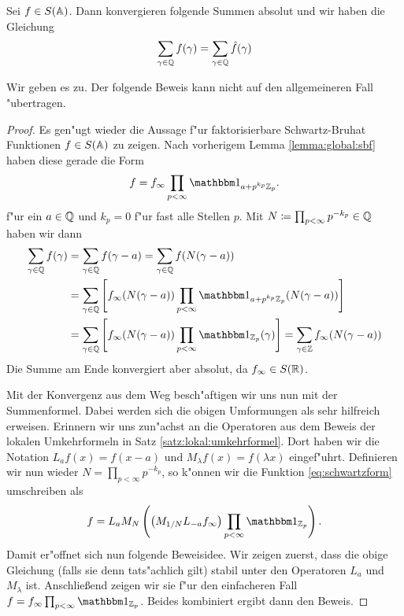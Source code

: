 	\begin{satz}
	\label{satz:global:poisson}
		Sei $f \in S(\mathbb{A})$. Dann konvergieren folgende Summen absolut und wir haben die Gleichung
		\begin{align}
			\sum_{\gamma \in \mathbb{Q}} {f(\gamma)} = \sum_{\gamma \in \mathbb{Q}}{\hat{f}(\gamma)}
		\end{align}
	\end{satz}
	Wir geben es zu. Der folgende Beweis kann nicht auf den allgemeineren Fall "ubertragen.
	\begin{proof}
		Es gen"ugt wieder die Aussage f"ur faktorisierbare Schwartz-Bruhat Funktionen $f \in S(\mathbb{A})$ zu zeigen.
		Nach vorherigem Lemma \ref{lemma:global:sbf} haben diese gerade die Form
		\begin{align}
		\label{eq:schwartzform}
			f = f_\infty\prod_{p<\infty} \ind_{a+p^{k_p}\Zp}.
		\end{align}
		f"ur ein $a \in \mathbb{Q}$ und $k_p = 0$ f"ur fast alle Stellen $p$.
		Mit $N\coloneqq \prod_{p<\infty} p^{-k_p} \in \mathbb{Q}$ haben wir dann
		\begin{align*}
			\sum_{\gamma \in \K} {f(\gamma)} 	&= 	\sum_{\gamma \in \K} f(\gamma - a)
												= 	\sum_{\gamma \in \K} f(N(\gamma - a)) \\
												&= 	\sum_{\gamma \in \K} \left[ f_\infty (N(\gamma - a))  \prod_{p< \infty} \ind_{a+p^{k_p}\Zp}(N(\gamma - a)) \right] \\
												&= 	\sum_{\gamma \in \K} \left[ f_\infty (N(\gamma - a))  \prod_{p< \infty} \ind_{\Zp}(\gamma) \right]
												=	\sum_{\gamma \in \Z} f_\infty (N(\gamma - a))
		\end{align*}
		Die Summe am Ende konvergiert aber absolut, da $f_\infty \in S(\mathbb{R})$.
		
		Mit der Konvergenz aus dem Weg besch"aftigen wir uns nun mit der Summenformel.
		Dabei werden sich die obigen Umformungen als sehr hilfreich erweisen.
		Erinnern wir uns zun"achst an die Operatoren aus dem Beweis der lokalen Umkehrformeln in Satz \ref{satz:lokal:umkehrformel}.
		Dort haben wir die Notation $L_a f(x) = f(x-a)$ und $M_\lambda f(x) = f(\lambda x)$ eingef"uhrt.
		Definieren wir nun wieder $N= \prod_{p<\infty} p^{-k_p}$, so k"onnen wir die Funktion \ref{eq:schwartzform} umschreiben als
		\begin{align*}
			f = L_a M_{N}\left( \left(M_{1/N} L_{-a} f_\infty\right) \prod_{p<\infty}\ind_{\Zp}\right).
		\end{align*}
		Damit er"offnet sich nun folgende Beweisidee. 
		Wir zeigen zuerst, dass die obige Gleichung (falls sie denn tats"achlich gilt) stabil unter den Operatoren $L_a$ und $M_\lambda$ ist.
		Anschließend zeigen wir sie f"ur den einfacheren Fall $f=f_\infty \prod_{p<\infty}\ind_{\Zp}$.
		Beides kombiniert ergibt dann den Beweis.
		

\end{proof}
